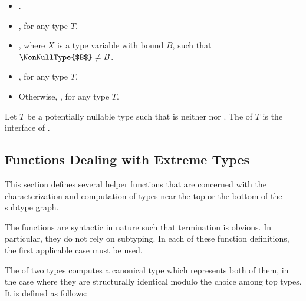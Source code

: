 \documentclass[makeidx]{article}
\begin{document}
{\begin{itemize}
\item
  .
\item
  ,
  for any type $T$.
\item
  ,
  where $X$ is a type variable with bound $B$,
  such that $\NonNullType{$B$} \not= B$.
\item
  ,
  for any type $T$.
\item
  Otherwise, ,
  for any type $T$.
\end{itemize}

\LMHash{}%
Let $T$ be a potentially nullable type such that
 is neither \DYNAMIC{} nor \VOID.
The 
of $T$ is the interface of .



\subsection{Functions Dealing with Extreme Types}

\LMHash{}%
This section defines several helper functions that are concerned with
the characterization and computation of types near the top or the bottom
of the subtype graph.

\LMHash{}%
The functions are syntactic in nature such that termination is obvious.
In particular, they do not rely on subtyping.
In each of these function definitions,
the first applicable case must be used.

\LMHash{}%
The \Index{\TopMergeTypeName} of two types computes
a canonical type which represents both of them,
in the case where they are structurally identical
modulo the choice among top types.
It is defined as follows:

}
\end{document}

